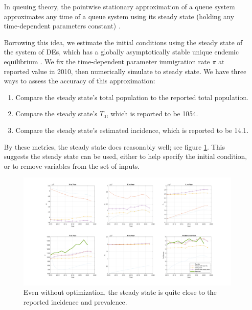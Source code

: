 \documentclass{article}
\begin{document}
In queuing theory, the pointwise stationary approximation of a queue system approximates any time of a queue system using its steady state (holding any time-dependent parameters constant) \cite{Green1991ThePS}.

Borrowing this idea, we estimate the initial conditions using the steady state of the system of DEs, which has a globally asymptotically stable unique endemic equilibrium \cite{GuoWu}.  We fix the time-dependent parameter immigration rate $\pi$ at reported value in 2010, then numerically simulate to steady state.  We have three ways to assess the accuracy of this approximation:
\begin{enumerate}
	\item Compare the steady state's total population to the reported total population.
	\item Compare the steady state's $T_0$, which is reported to be 1054.
	\item Compare the steady state's estimated incidence, which is reported to be 14.1.
\end{enumerate}

By these metrics, the steady state does reasonably well; see figure \ref{fig:PopVsTime_Various}.  This suggests the steady state can be used, either to help specify the initial condition, or to remove variables from the set of inputs.



\begin{figure}
		\centering
	\includegraphics[width=\textwidth]{PopVsTime_various} 
	
	\caption{Even without optimization, the steady state is quite close to the reported incidence and prevalence.}
	
	\label{fig:PopVsTime_Various}
\end{figure}
\end{document}
